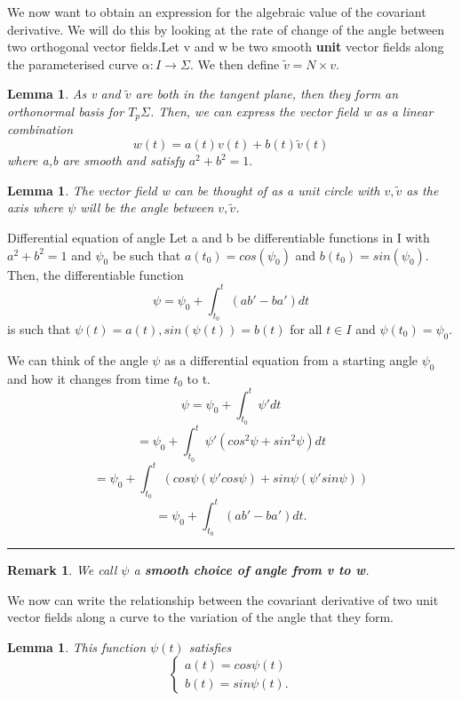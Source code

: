 \documentclass[twoside]{article}
\newtheorem{lemma}[theorem]{Lemma}
\newtheorem{remark}[theorem]{Remark}
\newenvironment{proof}{{\bf Proof:}}{\hfill\rule{2mm}{2mm}}
\begin{document}
We now want to obtain an expression for the algebraic value of the covariant derivative. We will do this by looking at the rate of change of the angle between two orthogonal vector fields.\newline Let v and w be two smooth \textbf{unit} vector fields along the parameterised curve $\alpha: I \rightarrow \Sigma$. We then define $\tilde{v} = N \times v.$ 

\begin{lemma}As v and $\tilde{v}$ are both in the tangent plane, then they form an orthonormal basis for $T_p\Sigma$. Then, we can express the vector field w as a linear combination 
$$
w(t) = a(t)v(t) + b(t)\tilde{v}(t)
$$
where a,b are smooth and satisfy $a^2 + b^2 = 1.$
\end{lemma}

\begin{lemma}The vector field w can be thought of as a unit circle with $v, \tilde{v}$ as the axis where $\psi$ will be the angle between $v, \tilde{v}$.
\end{lemma}

\begin{proposition_exam}{Differential equation of angle}{} Let a and b be differentiable functions in I with $a^2 + b^2 = 1$ and $\psi_0$ be such that $a(t_0) = cos(\psi_0)$ and $b(t_0) = sin(\psi_0).$ Then, the differentiable function 
$$
\psi = \psi_0 + \int_{t_{0}}^{t}(ab' - ba')dt
$$
is such that $\psi(t) = a(t), sin(\psi(t)) = b(t)$ for all $t \in I$ and $\psi(t_0) = \psi_0.$
\end{proposition_exam}

\begin{proof} We can think of the angle $\psi$ as a differential equation from a starting angle $\psi_0$ and how it changes from time $t_0$ to t.
$$
\psi = \psi_0 + \int_{t_{0}}^{t}\psi'dt
$$
$$
= \psi_0 + \int_{t_{0}}^{t}\psi'(cos^2\psi + sin^2\psi)dt
$$
$$
= \psi_0 + \int_{t_{0}}^{t}(cos\psi(\psi' cos\psi) + sin\psi(\psi'sin\psi))
$$
$$
= \psi_0 + \int_{t_{0}}^{t}(ab' - ba')dt.
$$
\end{proof}

\begin{remark}We call $\psi$ a \textbf{smooth choice of angle from v to w}.
\end{remark}

We now can write the relationship between the covariant derivative of two unit vector fields along a curve to the variation of the angle that they form.

\begin{lemma}This function $\psi(t)$ satisfies 
$$
\begin{cases}
a(t) = cos \psi(t)\\
b(t) = sin \psi(t).
\end{cases}
$$
\end{lemma}
\end{document}
